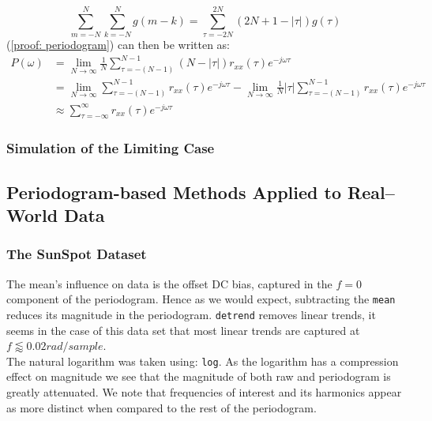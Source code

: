 \documentclass[12pt]{article}
\begin{document}
	\begin{equation}
		\sum_{m=-N}^{N} \sum_{k=-N}^{N} g(m-k) = \sum_{\tau=-2N}^{2N}(2N + 1 - |\tau|)g(\tau)
		\label{proof: periodogram:helper}
	\end{equation}
	\newline
	(\ref{proof: periodogram}) can then be written as:
	\vspace{-\baselineskip}
	\begin{align}
		P(\omega)    & =         \lim_{N\to\infty} \frac{1}{N} \sum_{\tau=-(N-1)}^{N-1}(N - |\tau|)r_{xx}(\tau) e^{-j\omega\tau}\nonumber\\
		& =         \lim_{N\to\infty} \sum_{\tau=-(N-1)}^{N-1} r_{xx}(\tau) e^{-j\omega\tau} -
		\lim_{N\to\infty} \frac{1}{N} |\tau| \sum_{\tau=-(N-1)}^{N-1} r_{xx}(\tau) e^{-j\omega\tau}\nonumber\\
		& \approx   \sum_{\tau=-\infty}^{\infty} r_{xx}(\tau) e^{-j\omega\tau}
		\label{proof: periodogram:shown}
	\end{align}
	
	\subsubsection{Simulation of the Limiting Case} \label{sec: 1-1b-prop-PSD}
	
	
	\subsection{Periodogram-based Methods Applied to Real–World Data} \label{sec: 1-2-PSD-real-world}
	\subsubsection{The SunSpot Dataset}
	The mean's influence on data is the offset DC bias, captured in the $f=0$ component of the periodogram. Hence as we would expect, subtracting the \texttt{mean} reduces its magnitude in the periodogram. \texttt{detrend} removes linear trends, it seems in the case of this data set that most linear trends are captured at $f\lessapprox 0.02 rad/sample$. \\
	
	The natural logarithm was taken using: \texttt{log}. As the logarithm has a compression effect on magnitude we see that the magnitude of both raw and periodogram is greatly attenuated. We note that frequencies of interest and its harmonics appear as more distinct when compared to the rest of the periodogram.
\end{document}
